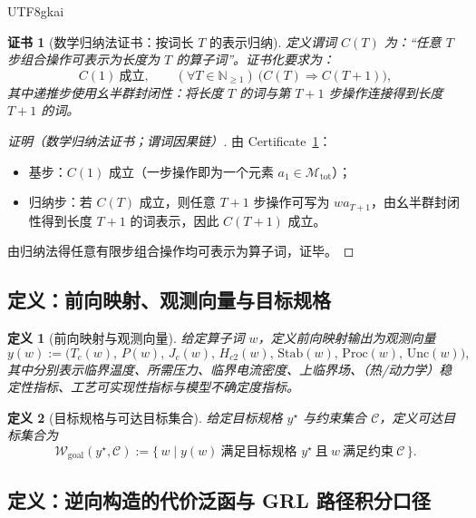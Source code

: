 \documentclass[12pt]{article}
\newtheorem{definition}{定义}[section]
\newtheorem{certificate}{证书}[section]
\begin{document}
\begin{CJK*}{UTF8}{gkai}
\begin{certificate}[数学归纳法证书：按词长 $T$ 的表示归纳]
\label{cert:ptopb-sc-word-completeness-induction}
定义谓词 $C(T)$ 为：“任意 $T$ 步组合操作可表示为长度为 $T$ 的算子词”。证书化要求为：
\[
C(1)\ \text{成立},\qquad
(\forall T\in\mathbb{N}_{\ge 1})\ \bigl(C(T)\Rightarrow C(T+1)\bigr),
\]
其中递推步使用幺半群封闭性：将长度 $T$ 的词与第 $T{+}1$ 步操作连接得到长度 $T{+}1$ 的词。
\end{certificate}

\begin{proof}[证明（数学归纳法证书；谓词因果链）]
由 Certificate~\ref{cert:ptopb-sc-word-completeness-induction}：
\begin{itemize}
  \item 基步：$C(1)$ 成立（一步操作即为一个元素 $a_1\in\mathcal{M}_{\mathrm{tot}}$）；
  \item 归纳步：若 $C(T)$ 成立，则任意 $T{+}1$ 步操作可写为 $w a_{T+1}$，由幺半群封闭性得到长度 $T{+}1$ 的词表示，因此 $C(T{+}1)$ 成立。
\end{itemize}
由归纳法得任意有限步组合操作均可表示为算子词，证毕。
\end{proof}

\subsection{定义：前向映射、观测向量与目标规格}

\begin{definition}[前向映射与观测向量]
\label{def:forward-map-y}
给定算子词 $w$，定义前向映射输出为观测向量
\[
y(w):=
\bigl(
T_c(w),\,P(w),\,J_c(w),\,H_{c2}(w),\,\mathrm{Stab}(w),\,\mathrm{Proc}(w),\,\mathrm{Unc}(w)
\bigr),
\]
其中分别表示临界温度、所需压力、临界电流密度、上临界场、（热/动力学）稳定性指标、工艺可实现性指标与模型不确定度指标。
\end{definition}

\begin{definition}[目标规格与可达目标集合]
\label{def:target-set}
给定目标规格 $y^\star$ 与约束集合 $\mathcal{C}$，定义可达目标集合为
\[
\mathcal{W}_{\mathrm{goal}}(y^\star,\mathcal{C})
:=
\{\,w \mid y(w)\ \text{满足目标规格 }y^\star\ \text{且}\ w\ \text{满足约束}\ \mathcal{C}\,\}.
\]
\end{definition}

\subsection{定义：逆向构造的代价泛函与 GRL 路径积分口径}


\end{CJK*}
\end{document}
